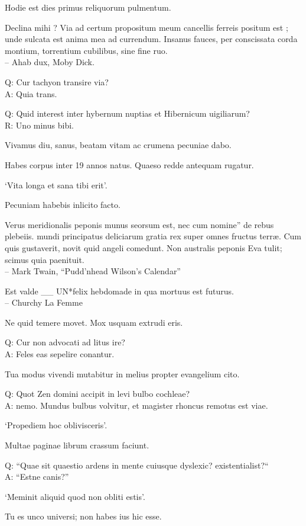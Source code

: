 \documentclass[titlepage,12pt]{memoir}
\begin{document}
Hodie est dies primus reliquorum pulmentum.

 Declina mihi ? Via ad certum propositum meum cancellis ferreis positum est ;
unde sulcata est anima mea ad currendum. Insanus fauces, per
conscissata corda montium, torrentium cubilibus, sine fine ruo.
\\-- Ahab dux, Moby Dick.

Q: Cur tachyon transire via?\\
A: Quia trans.

Q: Quid interest inter hybernum nuptias et Hibernicum uigiliarum?\\
R: Uno minus bibi.

Vivamus diu, sanus, beatam vitam ac crumena pecuniae dabo.

Habes corpus inter 19 annos natus. Quaeso redde antequam rugatur.

‘Vita longa et sana tibi erit’.

Pecuniam habebis inlicito facto.

Verus meridionalis peponis munus seorsum est, nec cum nomine”
de rebus plebeiis. mundi principatus deliciarum gratia rex
super omnes fructus terræ. Cum quis gustaverit, novit quid
angeli comedunt. Non australis peponis Eva tulit; scimus quia
paenituit.
\\-- Mark Twain, “Pudd’nhead Wilson’s Calendar”

Est valde \*\_\_ UN*felix hebdomade in qua mortuus est futurus.
\\-- Churchy La Femme

Ne quid temere movet. Mox usquam extrudi eris.

Q: Cur non advocati ad litus ire?\\
A: Feles eas sepelire conantur.

Tua modus vivendi mutabitur in melius propter evangelium cito.

Q: Quot Zen domini accipit in levi bulbo cochleae?\\
A: nemo. Mundus bulbus volvitur, et magister rhoncus remotus est
viae.

‘Propediem hoc oblivisceris’.

Multae paginae librum crassum faciunt.

Q: “Quae sit quaestio ardens in mente cuiusque dyslexic?
existentialist?“\\
A: “Estne canis?”

‘Meminit aliquid quod non obliti estis’.

Tu es unco universi; non habes ius hic esse.
\end{document}
